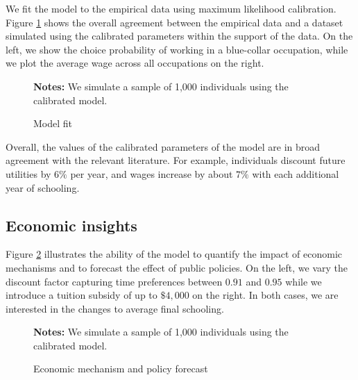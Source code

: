 \noindent We fit the model to the empirical data using maximum likelihood calibration. Figure \ref{Model fit} shows the overall agreement between the empirical data and a dataset simulated using the calibrated parameters within the support of the data. On the left, we show the choice probability of working in a blue-collar occupation, while we plot the average wage across all occupations on the right.
%
\begin{figure}[h!]\centering
\caption{Model fit}\label{Model fit}
\hspace{0.3cm}
\begin{center}
\begin{minipage}[t]{0.60\columnwidth}
\item \scriptsize{\textbf{Notes:} We simulate a sample of 1,000 individuals using the calibrated model.}
\end{minipage}\end{center}
\end{figure}\FloatBarrier
%
\noindent Overall, the values of the calibrated parameters of the model are in broad agreement with the relevant literature. For example, individuals discount future utilities by $6\%$ per year, and wages increase by about $7\%$ with each additional year of schooling.
\subsection{Economic insights}
Figure \ref{Economic mechanism and policy forecast} illustrates the ability of the model to quantify the impact of economic mechanisms and to forecast the effect of public policies. On the left, we vary the discount factor capturing time preferences between $0.91$ and $0.95$ while we introduce a tuition subsidy of up to $\$4,000$ on the right. In both cases, we are interested in the changes to average final schooling.

\begin{figure}[h!]\centering
\caption{Economic mechanism and policy forecast}\label{Economic mechanism and policy forecast}
\hspace{0.3cm}
\begin{center}
\begin{minipage}[t]{0.60\columnwidth}
\item \scriptsize{\textbf{Notes:} We simulate a sample of 1,000 individuals using the calibrated model.}
\end{minipage}
\end{center}
\end{figure}\FloatBarrier

